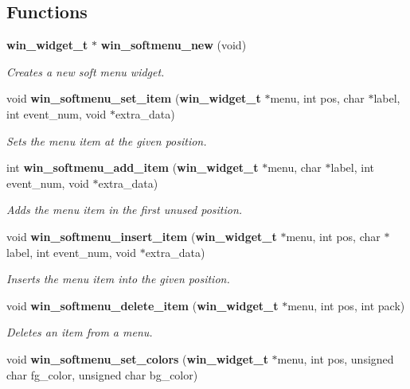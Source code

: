 \subsection*{Functions}
\begin{CompactItemize}
\item 
{\bf win\_\-widget\_\-t} $\ast$ {\bf win\_\-softmenu\_\-new} (void)
\begin{CompactList}\small\item\em Creates a new soft menu widget. \item\end{CompactList}\item 
void {\bf win\_\-softmenu\_\-set\_\-item} ({\bf win\_\-widget\_\-t} $\ast$menu, int pos, char $\ast$label, int event\_\-num, void $\ast$extra\_\-data)
\begin{CompactList}\small\item\em Sets the menu item at the given position. \item\end{CompactList}\item 
int {\bf win\_\-softmenu\_\-add\_\-item} ({\bf win\_\-widget\_\-t} $\ast$menu, char $\ast$label, int event\_\-num, void $\ast$extra\_\-data)
\begin{CompactList}\small\item\em Adds the menu item in the first unused position. \item\end{CompactList}\item 
void {\bf win\_\-softmenu\_\-insert\_\-item} ({\bf win\_\-widget\_\-t} $\ast$menu, int pos, char $\ast$label, int event\_\-num, void $\ast$extra\_\-data)
\begin{CompactList}\small\item\em Inserts the menu item into the given position. \item\end{CompactList}\item 
void {\bf win\_\-softmenu\_\-delete\_\-item} ({\bf win\_\-widget\_\-t} $\ast$menu, int pos, int pack)
\begin{CompactList}\small\item\em Deletes an item from a menu. \item\end{CompactList}\item 
void {\bf win\_\-softmenu\_\-set\_\-colors} ({\bf win\_\-widget\_\-t} $\ast$menu, int pos, unsigned char fg\_\-color, unsigned char bg\_\-color)\label{winsoftmenu_8h_a6}


\end{CompactItemize}
